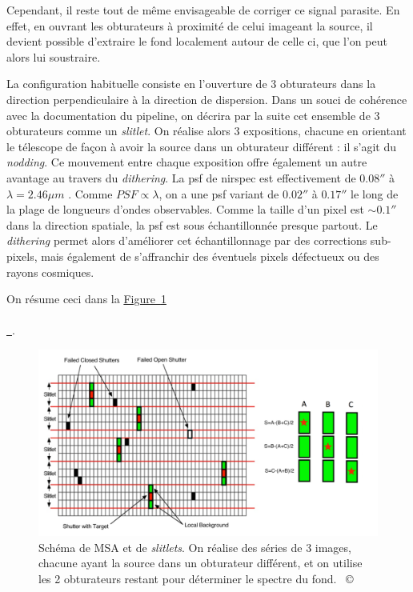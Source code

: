 \documentclass[12pt, a4paper]{article}
\newcommand{\customcite}[1]{\mbox{
  {\small \copyright} \cite{#1}}
}
\newcommand*{\figref}[2][]{%
  \hyperref[{#2}]{%
    Figure~\ref*{#2}%
    \ifx\\#1\\%
    \else
      \,#1%
    \fi
  }%
}
\begin{document}
Cependant, il reste tout de même envisageable de corriger ce signal parasite. En effet, en ouvrant les obturateurs à proximité de celui imageant la source, il devient possible d'extraire le fond localement autour de celle ci, que l'on peut alors lui soustraire.

La configuration habituelle consiste en l'ouverture de 3 obturateurs dans la direction perpendiculaire à la direction de dispersion. Dans un souci de cohérence avec la documentation du pipeline, on décrira par la suite cet ensemble de 3 obturateurs comme un \textit{slitlet}. On réalise alors 3 expositions, chacune en orientant le télescope de façon à avoir la source dans un obturateur différent : il s'agit du \textit{nodding}. Ce mouvement entre chaque exposition offre également un autre avantage au travers du \textit{dithering}. La \gls{psf} de \gls{nirspec} est effectivement de $0.08 ''$ à $\lambda = 2.46 \mu m$ \parencite{10_1051_0004_6361_202142663}. 
Comme $PSF \propto \lambda$, on a une \gls{psf} variant de $0.02 ''$ à $0.17''$ le long de la plage de longueurs d'ondes observables. Comme la taille d'un pixel est $\sim 0.1''$ dans la direction spatiale, la \gls{psf} est sous échantillonnée presque partout. Le \textit{dithering} permet alors d'améliorer cet échantillonnage par des corrections sub-pixels, mais également de s'affranchir des éventuels pixels défectueux ou des rayons cosmiques.

On résume ceci dans la \figref{fig:msa_slitlet}.


\begin{figure}[H]
  \centering
  \includegraphics[scale=0.2]{assets/MSA_sky_strategy.png}
  \caption{Schéma de MSA et de \textit{slitlets}. On réalise des séries de 3 images, chacune ayant la source dans un obturateur différent, et on utilise les 2 obturateurs restant pour déterminer le spectre du fond. \customcite{mos}}
  \label{fig:msa_slitlet}
\end{figure}
\end{document}
